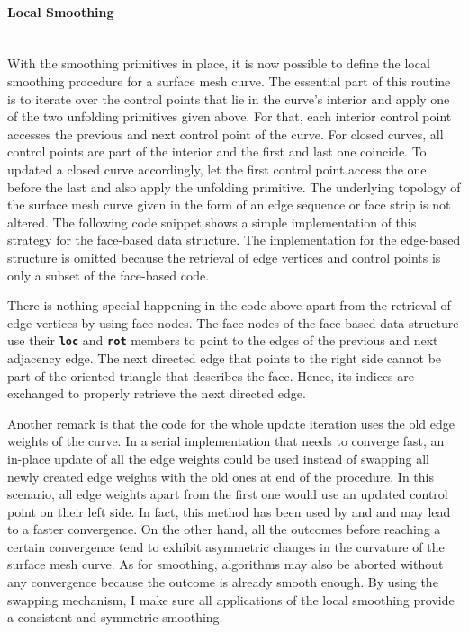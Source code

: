 \documentclass{stdlocal}
\begin{document}

  \paragraph{Local Smoothing}\hfill\\
  With the smoothing primitives in place, it is now possible to define the local smoothing procedure for a surface mesh curve.
  The essential part of this routine is to iterate over the control points that lie in the curve's interior and apply one of the two unfolding primitives given above.
  For that, each interior control point accesses the previous and next control point of the curve.
  For closed curves, all control points are part of the interior and the first and last one coincide.
  To updated a closed curve accordingly, let the first control point access the one before the last and also apply the unfolding primitive.
  The underlying topology of the surface mesh curve given in the form of an edge sequence or face strip is not altered.
  The following code snippet shows a simple implementation of this strategy for the face-based data structure.
  The implementation for the edge-based structure is omitted because the retrieval of edge vertices and control points is only a subset of the face-based code.

  There is nothing special happening in the code above apart from the retrieval of edge vertices by using face nodes.
  The face nodes of the face-based data structure use their \textbf{\texttt{loc}} and \textbf{\texttt{rot}} members to point to the edges of the previous and next adjacency edge.
  The next directed edge that points to the right side cannot be part of the oriented triangle that describes the face.
  Hence, its indices are exchanged to properly retrieve the next directed edge.

  Another remark is that the code for the whole update iteration uses the old edge weights of the curve.
  In a serial implementation that needs to converge fast, an in-place update of all the edge weights could be used instead of swapping all newly created edge weights with the old ones at end of the procedure.
  In this scenario, all edge weights apart from the first one would use an updated control point on their left side.
  In fact, this method has been used by \textcite{martinez2005} and \textcite{lawonn2014} and may lead to a faster convergence.
  On the other hand, all the outcomes before reaching a certain convergence tend to exhibit asymmetric changes in the curvature of the surface mesh curve.
  As for smoothing, algorithms may also be aborted without any convergence because the outcome is already smooth enough.
  By using the swapping mechanism, I make sure all applications of the local smoothing provide a consistent and symmetric smoothing.
\end{document}
